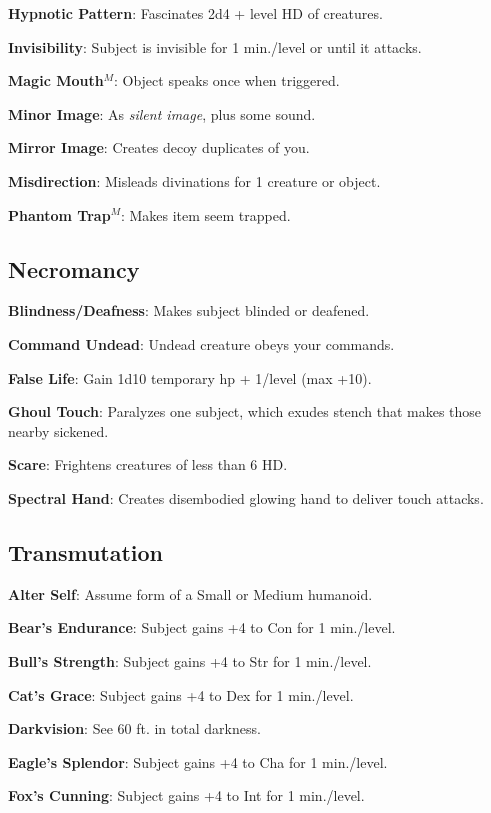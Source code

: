 \textbf{Hypnotic Pattern}: Fascinates 2d4 + level HD of creatures.

\textbf{Invisibility}: Subject is invisible for 1 min./level or until it attacks.

\textbf{Magic Mouth}\(^{M}\): Object speaks once when triggered.

\textbf{Minor Image}: As \textit{silent image}, plus some sound.

\textbf{Mirror Image}: Creates decoy duplicates of you.

\textbf{Misdirection}: Misleads divinations for 1 creature or object.

\textbf{Phantom Trap}\(^{M}\): Makes item seem trapped.

\subsection{Necromancy}


\textbf{Blindness/Deafness}: Makes subject blinded or deafened.

\textbf{Command Undead}: Undead creature obeys your commands.

\textbf{False Life}: Gain 1d10 temporary hp + 1/level (max +10).

\textbf{Ghoul Touch}: Paralyzes one subject, which exudes stench that makes those nearby sickened.

\textbf{Scare}: Frightens creatures of less than 6 HD.

\textbf{Spectral Hand}: Creates disembodied glowing hand to deliver touch attacks.

\subsection{Transmutation}


\textbf{Alter Self}: Assume form of a Small or Medium humanoid.

\textbf{Bear's Endurance}: Subject gains +4 to Con for 1 min./level.

\textbf{Bull's Strength}: Subject gains +4 to Str for 1 min./level.

\textbf{Cat's Grace}: Subject gains +4 to Dex for 1 min./level.

\textbf{Darkvision}: See 60 ft. in total darkness.

\textbf{Eagle's Splendor}: Subject gains +4 to Cha for 1 min./level.

\textbf{Fox's Cunning}: Subject gains +4 to Int for 1 min./level.

